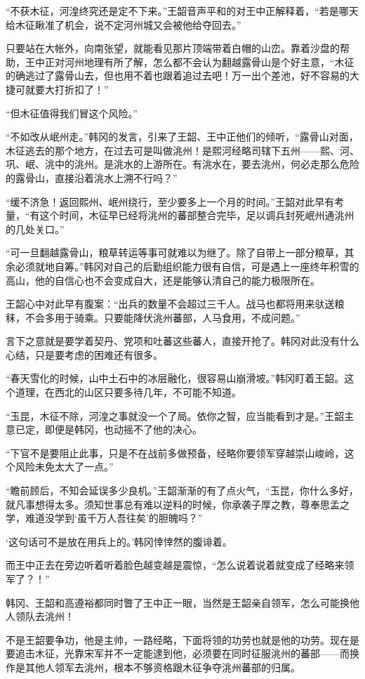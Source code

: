 “不获木征，河湟终究还是定不下来。”王韶音声平和的对王中正解释着，“若是哪天给木征瞅准了机会，说不定河州城又会被他给夺回去。”

只要站在大帐外，向南张望，就能看见那片顶端带着白帽的山峦。靠着沙盘的帮助，王中正对河州地理有所了解，怎么都不会认为翻越露骨山是个好主意，“木征的确逃过了露骨山去，但也用不着也跟着追过去吧！万一出个差池，好不容易的大捷可就要大打折扣了！”

“但木征值得我们冒这个风险。”

“不如改从岷州走。”韩冈的发言，引来了王韶、王中正他们的倾听，“露骨山对面，木征逃去的那个地方，在过去可是叫做洮州！是熙河经略司辖下五州——熙、河、巩、岷、洮中的洮州。是洮水的上游所在。有洮水在，要去洮州，何必走那么危险的露骨山，直接沿着洮水上溯不行吗？”

“缓不济急！返回熙州、岷州绕行，至少要多上一个月的时间。”王韶对此早有考量，“有这个时间，木征早已经将洮州的蕃部整合完毕，足以调兵封死岷州通洮州的几处关口。”

“可一旦翻越露骨山，粮草转运等事可就难以为继了。除了自带上一部分粮草，其余必须就地自筹。”韩冈对自己的后勤组织能力很有自信，可是遇上一座终年积雪的高山，他的自信心也不会变成自大，还是能够认清自己的能力极限所在。

王韶心中对此早有腹案：“出兵的数量不会超过三千人。战马也都将用来驮送粮秣，不会多用于骑乘。只要能降伏洮州蕃部，人马食用，不成问题。”

言下之意就是要学着契丹、党项和吐蕃这些蕃人，直接开抢了。韩冈对此没有什么心结，只是要考虑的困难还有很多。

“春天雪化的时候，山中土石中的冰层融化，很容易山崩滑坡。”韩冈盯着王韶。这个道理，在西北的山区只要多待几年，不可能不知道。

“玉昆，木征不除，河湟之事就没一个了局。依你之智，应当能看到才是。”王韶主意已定，即便是韩冈，也动摇不了他的决心。

“下官不是要阻止此事，只是不在战前多做预备，经略你要领军穿越崇山峻岭，这个风险未免太大了一点。”

“瞻前顾后，不知会延误多少良机。”王韶渐渐的有了点火气，“玉昆，你什么多好，就凡事想得太多。须知世事总有难以逆料的时候，你承袭子厚之教，尊奉思孟之学，难道没学到‘虽千万人吾往矣’的胆魄吗？”

‘这句话可不是放在用兵上的。’韩冈悻悻然的腹诽着。

而王中正去在旁边听着听着脸色越变越是震惊，“怎么说着说着就变成了经略来领军了？！”

韩冈、王韶和高遵裕都同时瞥了王中正一眼，当然是王韶亲自领军，怎么可能换他人领队去洮州！

不是王韶要争功，他是主帅，一路经略，下面将领的功劳也就是他的功劳。现在是要追击木征，光靠宋军并不一定能逮到他，必须要在同时征服洮州的蕃部——而换作是其他人领军去洮州，根本不够资格跟木征争夺洮州蕃部的归属。

